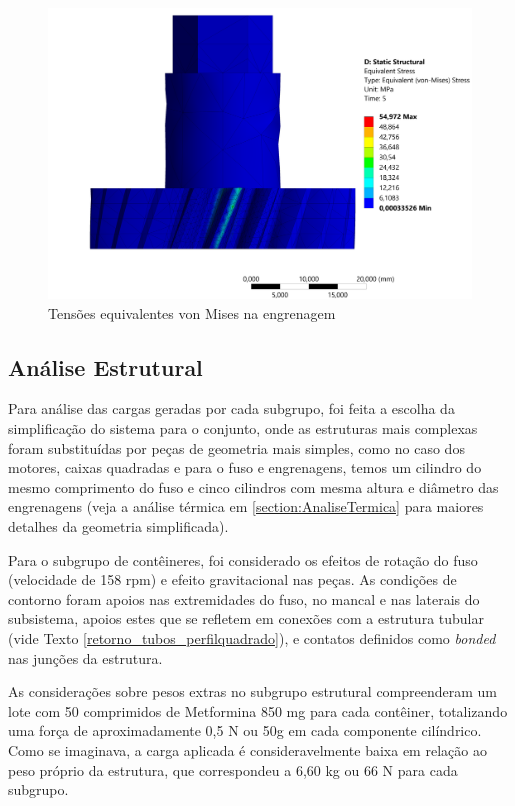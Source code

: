 \begin{figure}[H]
        \centering
        \includegraphics[width=.8\textwidth]{figuras/estrutura/InteracaoFusoEng/tensao engrenagem.png}
        \caption{Tensões equivalentes von Mises na engrenagem}
        \label{fig:tensaoeng}
    \end{figure}    


\subsection{Análise Estrutural}
    
Para análise das cargas geradas por cada subgrupo, foi feita a escolha da simplificação do sistema para o conjunto, onde as estruturas mais complexas foram substituídas por peças de geometria mais simples, como no caso dos motores, caixas quadradas e para o fuso e engrenagens, temos um cilindro do mesmo comprimento do fuso e cinco cilindros com mesma altura e diâmetro das engrenagens (veja a análise térmica em \ref{section:AnaliseTermica} para maiores detalhes da geometria simplificada).


Para o subgrupo de contêineres, foi considerado os efeitos de rotação do fuso (velocidade de 158 rpm) e efeito gravitacional nas peças. As condições de contorno foram apoios nas extremidades do fuso, no mancal e nas laterais do subsistema, apoios estes que se refletem em conexões com a estrutura tubular (vide Texto \ref{retorno_tubos_perfilquadrado}), e contatos definidos como \textit{bonded} nas junções da estrutura. 

As considerações sobre pesos extras no subgrupo estrutural compreenderam um lote com 50 comprimidos de Metformina 850 mg para cada contêiner, totalizando uma força de aproximadamente 0,5 N ou 50g em cada componente cilíndrico. Como se imaginava, a carga aplicada é consideravelmente baixa em relação ao peso próprio da estrutura, que correspondeu a 6,60 kg ou 66 N para cada subgrupo. 

